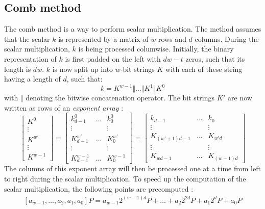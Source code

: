 \subsection{Comb method} \label{subsec: Comb method}
The comb method is a way to perform scalar multiplication.
The method assumes that the scalar $k$ is represented by a matrix of $w$ rows and $d$ columns.
During the scalar multiplication, $k$ is being processed columwise. 
Initially, the binary representation of $k$ is first padded on the left with $dw - t$ zeros, such that its length is $dw$.
$k$ is now split up into $w$-bit strings $K$ with each of these string having a length of $d$, such that:
%
\begin{equation*}
k = K^{w-1} \Vert \dots \Vert  K^{1} \Vert K^0
\end{equation*}
%
with $\Vert$ denoting the bitwise concatenation operator.
The bit strings $K^j$ are now written as rows of an \emph{exponent array} \cite{hankerson2006guide}:
%
\begin{equation*}
%
\begin{bmatrix}
		K^0 \\
		\vdots \\
		K^{w'} \\
		\vdots \\
		K^{w - 1}
\end{bmatrix}
%
=
%
\begin{bmatrix}
k_{d-1}^0 & \dots & k_0^0 \\
\vdots & & \vdots \\
K_{d-1}^{w'} & \dots & K_0^{w'} \\
\vdots & & \vdots \\
K_{d-1}^{w-1} & \dots & K_0^{w - 1}
\end{bmatrix}
%
=
%
\begin{bmatrix}
k_{d-1} & \dots & k_0 \\
\vdots & & \vdots \\
K_{(w'+1)d-1} & \dots & K_{w'd} \\
\vdots & & \vdots \\
K_{wd-1} & \dots & K_{(w-1)d}
\end{bmatrix}
\end{equation*}
%
The columns of this exponent array will then be processed one at a time from left to right during the scalar multiplication.
To speed up the computation of the scalar multiplication, the following points are precomputed \cite{hankerson2006guide}:
%
\begin{align*}
\left[ a_{w - 1}, \ldots, a_2, a_1, a_0 \right]P = a_{w-1} 2^{(w-1)d} P + \ldots + a_2 2^{2d} P + a_1 2^ d P + a_0 P
\end{align*}
